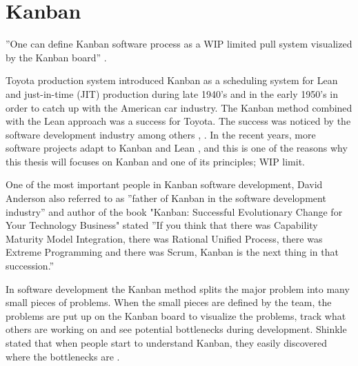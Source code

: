 \documentclass[UKenglish]{ifimaster}  %
\begin{document}
\section{Kanban}
\label{sec:Kan}

''One can define Kanban software process as a WIP limited pull system visualized by the Kanban board''  \parencite{DavidAnderson}.

Toyota production system introduced Kanban as a scheduling system for Lean and just-in-time (JIT) production during late 1940's and in the early 1950's in order to catch up with the American car industry. The Kanban method combined with the Lean approach was a success for Toyota. The success was noticed by the software development industry among others \parencite{Conboy}, \parencite{ono1988toyota}. In the recent years, more software projects adapt to Kanban and Lean \parencite{DavidAnderson}, and this is one of the reasons why this thesis will focuses on Kanban and one of its principles; WIP limit. 


One of the most important people in Kanban software development, David Anderson  also referred to as ''father of Kanban in the software development industry''  \parencite{InfoQ:2013:May:Online} and author of the book "Kanban: Successful Evolutionary Change for Your Technology Business" stated ''If you think that there was Capability Maturity Model Integration, there was Rational Unified Process, there was Extreme Programming and there was Scrum, Kanban is the next thing in that succession.''   \parencite{InfoQ} 

In software development the Kanban method splits the major problem into many small pieces of problems. When the small pieces are defined by the team, the problems are put up on the Kanban board to visualize the problems, track what others are working on and see potential bottlenecks during development. Shinkle stated that when people start to understand Kanban, they easily discovered where the bottlenecks are \parencite{Shinkle}.
\end{document}
